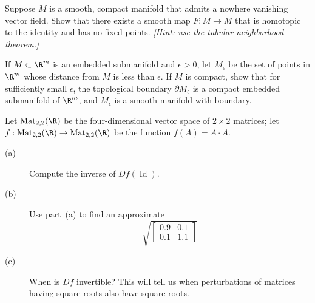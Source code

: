 \documentclass[12pt]{pset}
\DeclareMathOperator{\Mat}{Mat}
\DeclareMathOperator{\Id}{Id}
\begin{document}
\vfill

\begin{problem}[Lee 10--5]

  Suppose $M$ is a smooth, compact manifold that admits a nowhere
  vanishing vector field.  Show that there exists a smooth map $F : M
  \to M$ that is homotopic to the identity and has no fixed points.
  \textit{[Hint: use the tubular neighborhood theorem.]}

\end{problem}

\vfill

\begin{problem}[Lee 10--3]

  If $M \subset \R^m$ is an embedded submanifold and $\epsilon > 0$,
  let $M_\epsilon$ be the set of points in $\R^m$ whose distance from
  $M$ is less than $\epsilon$.  If $M$ is compact, show that for
  sufficiently small $\epsilon$, the topological boundary $\partial
  M_\epsilon$ is a compact embedded submanifold of $\R^m$, and
  $M_\epsilon$ is a smooth manifold with boundary.

\end{problem}

\vfill

\pagebreak


\begin{problem}

  Let $\Mat_{2,2}(\R)$ be the four-dimensional vector space of $2
  \times 2$ matrices; let $f
: \Mat_{2,2}(\R) \to \Mat_{2,2}(\R)$ be the function $f(A) = A \cdot A$.

\begin{description}
  \item[(a)] Compute the inverse of $D f(\Id)$.
    \item[(b)] Use part~(a) to find an approximate
$$
\sqrt{ \begin{bmatrix}
0.9 & 0.1  \\
0.1 & 1.1
\end{bmatrix}}
$$
\item[(c)] When is $D f$ invertible?  This will tell us when perturbations of
matrices having square roots also have square roots.
\end{description}

\end{problem}
\end{document}
